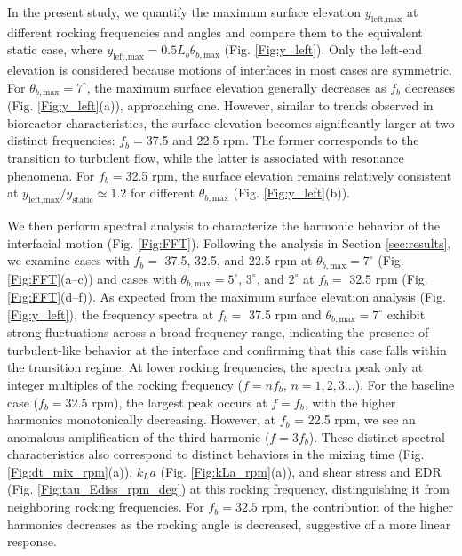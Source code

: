\documentclass[final,3p,times,twocolumn,authoryear]{elsarticle}
\theoremstyle{definition}
\begin{document}
In the present study, we quantify the maximum surface elevation $y_\textrm{{left,max}}$ at different rocking frequencies and angles and compare them to the equivalent static case, where $y_\textrm{{left,max}} = 0.5L_b\theta_{b,\textrm{max}}$ (Fig. \ref{Fig:y_left}). Only the left-end elevation is considered because motions of interfaces in most cases are symmetric. For $\theta_{b,\textrm{max}} = 7^{\circ}$, the maximum surface elevation generally decreases as $f_b$ decreases (Fig. \ref{Fig:y_left}(a)), approaching one. However, similar to trends observed in bioreactor characteristics, the surface elevation becomes significantly larger at two distinct frequencies: $f_b = $37.5 and 22.5 rpm. The former corresponds to the transition to turbulent flow, while the latter is associated with resonance phenomena. For $f_b = $32.5 rpm, the surface elevation remains relatively consistent at $y_\textrm{{left,max}}/y_\textrm{{static}} \simeq 1.2$ for different $\theta_{b,\textrm{max}}$ (Fig. \ref{Fig:y_left}(b)).
 
We then perform spectral analysis to characterize the harmonic behavior of the interfacial motion (Fig. \ref{Fig:FFT}). Following the analysis in Section \ref{sec:results}, we examine cases with $f_b=$ 37.5, 32.5, and 22.5 rpm at $\theta_{b,\textrm{max}} = 7^{\circ}$ (Fig. \ref{Fig:FFT}(a--c)) and cases with $\theta_{b,\textrm{max}} = 5^{\circ}$, $3^{\circ}$, and $2^{\circ}$ at $f_b=$ 32.5 rpm (Fig. \ref{Fig:FFT}(d--f)). As expected from the maximum surface elevation analysis (Fig. \ref{Fig:y_left}), the frequency spectra at $f_b=$ 37.5 rpm and $\theta_{b,\textrm{max}} = 7^{\circ}$ exhibit strong fluctuations across a broad frequency range, indicating the presence of turbulent-like behavior at the interface and confirming that this case falls within the transition regime. At lower rocking frequencies, the spectra peak only at integer multiples of the rocking frequency ($f=nf_b$, $n=1,2,3 ...$). For the baseline case ($f_b = 32.5$ rpm), the largest peak occurs at $f=f_b$, with the higher harmonics monotonically decreasing. However, at $f_b$ = 22.5 rpm, we see an anomalous amplification of the third harmonic ($f=3f_b$). These distinct spectral characteristics also correspond to distinct behaviors in the mixing time (Fig. \ref{Fig:dt_mix_rpm}(a)), $k_La$ (Fig. \ref{Fig:kLa_rpm}(a)), and shear stress and EDR (Fig. \ref{Fig:tau_Ediss_rpm_deg}) at this rocking frequency, distinguishing it from neighboring rocking frequencies. For $f_b = 32.5$ rpm, the contribution of the higher harmonics decreases as the rocking angle is decreased, suggestive of a more linear response. 
 
\end{document}
